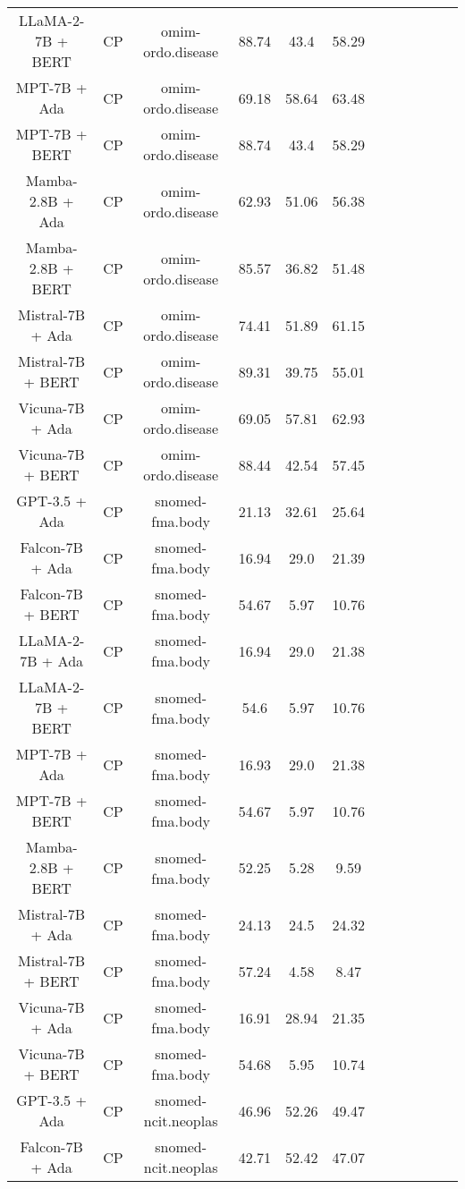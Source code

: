 \begin{table}
\begin{tabular}{|c|c|c|c|c|c|c|c|c|c|c|c|}
	LLaMA-2-7B + BERT  & CP & omim-ordo.disease  &  88.74 &  43.4 & 58.29  \\
	MPT-7B + Ada  & CP & omim-ordo.disease  &  69.18 &  58.64 & 63.48  \\
	MPT-7B + BERT  & CP & omim-ordo.disease  &  88.74 &  43.4 & 58.29  \\
	Mamba-2.8B + Ada  & CP & omim-ordo.disease  &  62.93 &  51.06 & 56.38  \\
	Mamba-2.8B + BERT  & CP & omim-ordo.disease  &  85.57 &  36.82 & 51.48  \\
	Mistral-7B + Ada  & CP & omim-ordo.disease  &  74.41 &  51.89 & 61.15  \\
	Mistral-7B + BERT  & CP & omim-ordo.disease  &  89.31 &  39.75 & 55.01  \\
	Vicuna-7B + Ada  & CP & omim-ordo.disease  &  69.05 &  57.81 & 62.93  \\
	Vicuna-7B + BERT  & CP & omim-ordo.disease  &  88.44 &  42.54 & 57.45  \\
	\hline
	GPT-3.5 + Ada  & CP & snomed-fma.body  &  21.13 &  32.61 & 25.64  \\
	Falcon-7B + Ada  & CP & snomed-fma.body  &  16.94 &  29.0 & 21.39  \\
	Falcon-7B + BERT  & CP & snomed-fma.body  &  54.67 &  5.97 & 10.76  \\
	LLaMA-2-7B + Ada  & CP & snomed-fma.body  &  16.94 &  29.0 & 21.38  \\
	LLaMA-2-7B + BERT  & CP & snomed-fma.body  &  54.6 &  5.97 & 10.76  \\
	MPT-7B + Ada  & CP & snomed-fma.body  &  16.93 &  29.0 & 21.38  \\
	MPT-7B + BERT  & CP & snomed-fma.body  &  54.67 &  5.97 & 10.76  \\
	Mamba-2.8B + BERT  & CP & snomed-fma.body  &  52.25 &  5.28 & 9.59  \\
	Mistral-7B + Ada  & CP & snomed-fma.body  &  24.13 &  24.5 & 24.32  \\
	Mistral-7B + BERT  & CP & snomed-fma.body  &  57.24 &  4.58 & 8.47  \\
	Vicuna-7B + Ada  & CP & snomed-fma.body  &  16.91 &  28.94 & 21.35  \\
	Vicuna-7B + BERT  & CP & snomed-fma.body  &  54.68 &  5.95 & 10.74  \\
	\hline
	GPT-3.5 + Ada  & CP & snomed-ncit.neoplas  &  46.96 &  52.26 & 49.47  \\
	Falcon-7B + Ada  & CP & snomed-ncit.neoplas  &  42.71 &  52.42 & 47.07  \\

\end{tabular}
\end{table}
